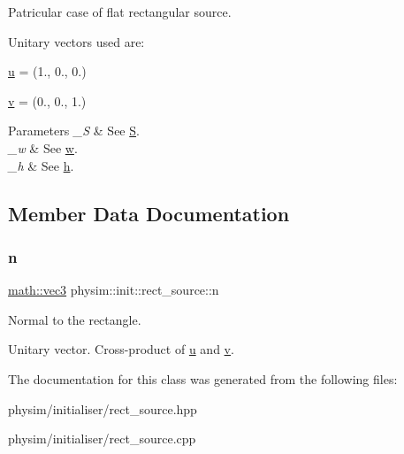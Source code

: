 Patricular case of flat rectangular source. 

Unitary vectors used are\+:
\begin{DoxyItemize}
\item \hyperlink{classphysim_1_1init_1_1rect__source_ab46280374968757bd185cb9053020371}{u} = (1., 0., 0.)
\item \hyperlink{classphysim_1_1init_1_1rect__source_a3373fe0fda8e01ba6680bde903b371b1}{v} = (0., 0., 1.) 
\begin{DoxyParams}{Parameters}
{\em \+\_\+S} & See \hyperlink{classphysim_1_1init_1_1rect__source_ab12449975c6df03027ff17b424fb151b}{S}. \\
\hline
{\em \+\_\+w} & See \hyperlink{classphysim_1_1init_1_1rect__source_a4a7f1402b417e2217ab3724e6e55c18b}{w}. \\
\hline
{\em \+\_\+h} & See \hyperlink{classphysim_1_1init_1_1rect__source_a9ada91327596758bd9e1d5053db0ff73}{h}. \\
\hline
\end{DoxyParams}

\end{DoxyItemize}

\subsection{Member Data Documentation}
\mbox{\label{classphysim_1_1init_1_1rect__source_af4540b1269f8a0bf26fe7cad23bdbdd2}} 
\subsubsection{\texorpdfstring{n}{n}}
{\footnotesize\ttfamily \hyperlink{structphysim_1_1math_1_1vec3}{math\+::vec3} physim\+::init\+::rect\+\_\+source\+::n\hspace{0.3cm}{\ttfamily [protected]}}



Normal to the rectangle. 

Unitary vector. Cross-\/product of \hyperlink{classphysim_1_1init_1_1rect__source_ab46280374968757bd185cb9053020371}{u} and \hyperlink{classphysim_1_1init_1_1rect__source_a3373fe0fda8e01ba6680bde903b371b1}{v}. 

The documentation for this class was generated from the following files\+:\begin{DoxyCompactItemize}
\item 
physim/initialiser/rect\+\_\+source.\+hpp\item 
physim/initialiser/rect\+\_\+source.\+cpp\end{DoxyCompactItemize}
